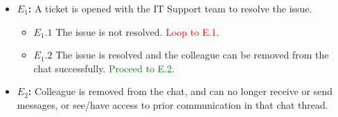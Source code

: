 \documentclass[]{article}
\begin{document}
\begin{enumerate}[\bf {BE}8.]
{{\begin{itemize}
					\item {\bf $E_{1}$:}  A ticket is opened with the IT Support team to resolve the issue.
					      \begin{itemize}
						      \item {\bf $E_{1}.1$} The issue is not resolved. \textcolor{red}{Loop to E.1}.
						      \item {\bf $E_{1}.2$} The issue is resolved and the colleague can be removed from the chat successfully. \textcolor{green}{Proceed to E.2}.
					      \end{itemize}

					\item {\bf $E_{2}$:}  Colleague is removed from the chat, and can no longer receive or send messages, or see/have access to prior communication in that chat thread.

				\end{itemize}
			}%
		}%
\end{enumerate}
\end{document}
